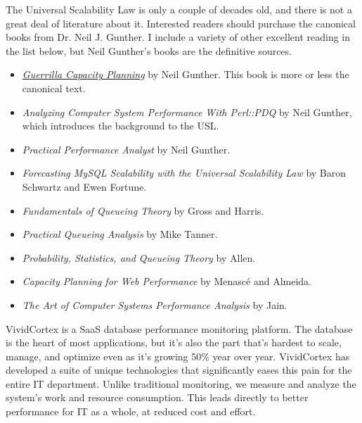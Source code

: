 \documentclass{vivid_layout}
\begin{document}
The Universal Scalability Law is only a couple of decades old, and there is not a
great deal of literature about it. Interested readers should purchase the
canonical books from Dr. Neil J. Gunther. I include a variety of other excellent
reading in the list below, but Neil Gunther's books are the definitive sources.

\begin{itemize}
\item \href{http://www.springer.com/book/978-3-540-26138-4}{\itshape Guerrilla Capacity Planning} by Neil Gunther. This book is more or less the canonical text.
\item {\itshape Analyzing Computer System Performance With Perl::PDQ} by Neil
Gunther, which introduces the background to the USL.
\item {\itshape Practical Performance Analyst} by Neil Gunther.
\item {\itshape Forecasting MySQL Scalability with the Universal Scalability Law} by Baron Schwartz and Ewen Fortune.
\item {\itshape Fundamentals of Queueing Theory} by Gross and Harris.
\item {\itshape Practical Queueing Analysis} by Mike Tanner.
\item {\itshape Probability, Statistics, and Queueing Theory} by Allen.
\item {\itshape Capacity Planning for Web Performance} by Menasc\'e and Almeida.
\item {\itshape The Art of Computer Systems Performance Analysis} by Jain.
\end{itemize}

\newpage

\begin{about}	%
VividCortex is a SaaS database performance monitoring platform. The database is the heart of most applications, but it's also the part that's hardest to scale, manage, and optimize even as it's growing 50\% year over year. VividCortex has developed a suite of unique technologies that significantly eases this pain for the entire IT department. Unlike traditional monitoring, we measure
and analyze the system's work and resource consumption. This leads directly to better performance for IT as a whole, at reduced cost and effort.
\end{about}
\makeresources	%
\end{document}
